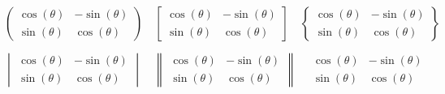 \documentclass[crop,varwidth=10cm]{standalone}
\begin{document}
    \centering
    $ \begin{pmatrix}
        \cos(\theta) & -\sin(\theta)\\
        \sin(\theta) & \cos(\theta)
    \end{pmatrix}\quad 
    \begin{bmatrix}
        \cos(\theta) & -\sin(\theta)\\
        \sin(\theta) & \cos(\theta)
    \end{bmatrix}\quad
    \begin{Bmatrix}
        \cos(\theta) & -\sin(\theta)\\
        \sin(\theta) & \cos(\theta)
    \end{Bmatrix} $

    \vspace{5pt}
    $
    \begin{vmatrix}
        \cos(\theta) & -\sin(\theta)\\
        \sin(\theta) & \cos(\theta)
    \end{vmatrix}\quad
    \begin{Vmatrix}
        \cos(\theta) & -\sin(\theta)\\
        \sin(\theta) & \cos(\theta)
    \end{Vmatrix}\quad
    \begin{matrix}
        \cos(\theta) & -\sin(\theta)\\
        \sin(\theta) & \cos(\theta)
    \end{matrix}
    $

        
\end{document}
